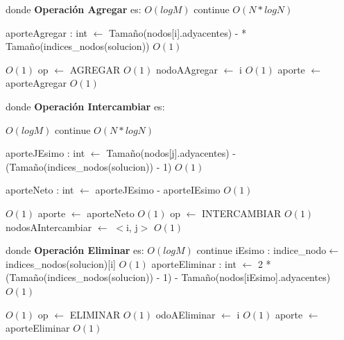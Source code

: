 \documentclass[a4paper, 10pt, twoside]{article}
\newenvironment{pseudo}[1][]{%
    \vspace{1em}%
    \begin{algorithmic}%
}
{%
    \end{algorithmic}%
    \vspace{1em}%
}
\newcommand{\Ode}[1]{\hfill $O(#1)$}
\begin{document}
\begin{pseudo}
\EndProcedure

\State donde \textbf{Operación Agregar} es:
\State
																					\Ode{log M}
			\State continue
			\EndIf
											\Ode{N*log N}

				\State aporteAgregar : int $\leftarrow$ Tamaño(nodos[i].adyacentes) - 
				 * Tamaño(indices\_nodos(solucion))															\Ode{1}

																						\Ode{1}
					\State op $\leftarrow$ AGREGAR 																	\Ode{1}
					\State nodoAAgregar $\leftarrow$ i 																\Ode{1}
					\State aporte $\leftarrow$ aporteAgregar														\Ode{1}
				\EndIf
			\EndIf
		\EndFor

\State
\State donde \textbf{Operación Intercambiar} es:
\State

																					\Ode{log M}
					\State continue
				\EndIf
									\Ode{N*log N}

					\State aporteJEsimo : int $\leftarrow$ Tamaño(nodos[j].adyacentes) - 
					\State (Tamaño(indices\_nodos(solucion)) - 1)													\Ode{1}

					\State aporteNeto : int $\leftarrow$ aporteJEsimo - aporteIEsimo								\Ode{1}

																							\Ode{1}
						\State aporte $\leftarrow$ aporteNeto														\Ode{1}
						\State op $\leftarrow$ INTERCAMBIAR 														\Ode{1}
						\State nodosAIntercambiar $\leftarrow$ $<$i, j$>$ 											\Ode{1}
					\EndIf
				\EndIf
			\EndFor

\State
\State donde \textbf{Operación Eliminar} es:
\State
																					\Ode{log M}
				  \State continue
			\EndIf
			\State iEsimo : indice\_nodo$\leftarrow$ indices\_nodos(solucion)[i]									\Ode{1}
			\State aporteEliminar : int $\leftarrow$ 2 * (Tamaño(indices\_nodos(solucion)) - 1) -
			\State Tamaño(nodos[iEsimo].adyacentes)																	\Ode{1}

																						\Ode{1}
				\State op $\leftarrow$ ELIMINAR 																	\Ode{1}
				\State odoAEliminar $\leftarrow$ i 																	\Ode{1}
				\State aporte $\leftarrow$ aporteEliminar 															\Ode{1}
			\EndIf
		\EndFor

\State

\end{pseudo}
\end{document}

